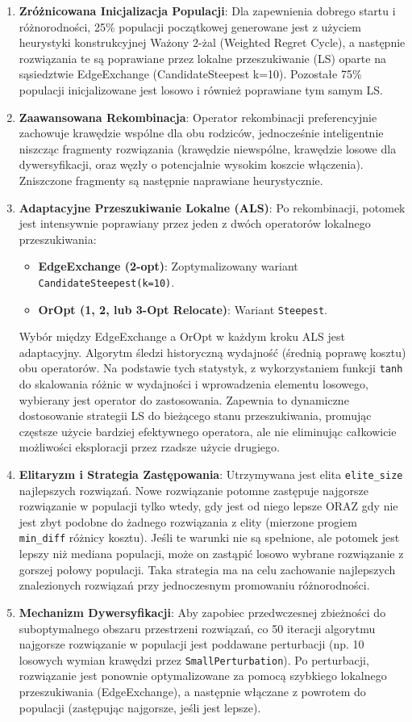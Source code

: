 \documentclass[12pt,a4paper]{article}
\begin{document}
\begin{enumerate}
    \item \textbf{Zróżnicowana Inicjalizacja Populacji}: Dla zapewnienia dobrego startu i różnorodności, 25\% populacji początkowej generowane jest z użyciem heurystyki konstrukcyjnej Ważony 2-żal (Weighted Regret Cycle), a następnie rozwiązania te są poprawiane przez lokalne przeszukiwanie (LS) oparte na sąsiedztwie EdgeExchange (CandidateSteepest k=10). Pozostałe 75\% populacji inicjalizowane jest losowo i również poprawiane tym samym LS.
    \item \textbf{Zaawansowana Rekombinacja}: Operator rekombinacji preferencyjnie zachowuje krawędzie wspólne dla obu rodziców, jednocześnie inteligentnie niszcząc fragmenty rozwiązania (krawędzie niewspólne, krawędzie losowe dla dywersyfikacji, oraz węzły o potencjalnie wysokim koszcie włączenia). Zniszczone fragmenty są następnie naprawiane heurystycznie.
    \item \textbf{Adaptacyjne Przeszukiwanie Lokalne (ALS)}: Po rekombinacji, potomek jest intensywnie poprawiany przez jeden z dwóch operatorów lokalnego przeszukiwania:
    \begin{itemize}
        \item \textbf{EdgeExchange (2-opt)}: Zoptymalizowany wariant \texttt{CandidateSteepest(k=10)}.
        \item \textbf{OrOpt (1, 2, lub 3-Opt Relocate)}: Wariant \texttt{Steepest}.
    \end{itemize}
    Wybór między EdgeExchange a OrOpt w każdym kroku ALS jest adaptacyjny. Algorytm śledzi historyczną wydajność (średnią poprawę kosztu) obu operatorów. Na podstawie tych statystyk, z wykorzystaniem funkcji \texttt{tanh} do skalowania różnic w wydajności i wprowadzenia elementu losowego, wybierany jest operator do zastosowania. Zapewnia to dynamiczne dostosowanie strategii LS do bieżącego stanu przeszukiwania, promując częstsze użycie bardziej efektywnego operatora, ale nie eliminując całkowicie możliwości eksploracji przez rzadsze użycie drugiego.
    \item \textbf{Elitaryzm i Strategia Zastępowania}: Utrzymywana jest elita \texttt{elite\_size} najlepszych rozwiązań. Nowe rozwiązanie potomne zastępuje najgorsze rozwiązanie w populacji tylko wtedy, gdy jest od niego lepsze ORAZ gdy nie jest zbyt podobne do żadnego rozwiązania z elity (mierzone progiem \texttt{min\_diff} różnicy kosztu). Jeśli te warunki nie są spełnione, ale potomek jest lepszy niż mediana populacji, może on zastąpić losowo wybrane rozwiązanie z gorszej połowy populacji. Taka strategia ma na celu zachowanie najlepszych znalezionych rozwiązań przy jednoczesnym promowaniu różnorodności.
    \item \textbf{Mechanizm Dywersyfikacji}: Aby zapobiec przedwczesnej zbieżności do suboptymalnego obszaru przestrzeni rozwiązań, co 50 iteracji algorytmu najgorsze rozwiązanie w populacji jest poddawane perturbacji (np. 10 losowych wymian krawędzi przez \texttt{SmallPerturbation}). Po perturbacji, rozwiązanie jest ponownie optymalizowane za pomocą szybkiego lokalnego przeszukiwania (EdgeExchange), a następnie włączane z powrotem do populacji (zastępując najgorsze, jeśli jest lepsze).
\end{enumerate}
\end{document}
